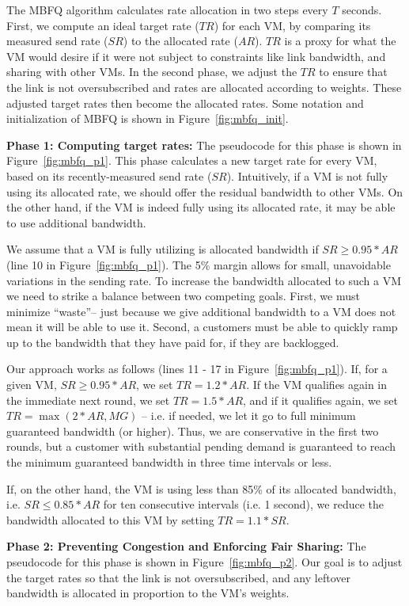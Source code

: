 The MBFQ algorithm calculates rate allocation in two steps every $T$ seconds.
First, we compute an ideal target rate ($TR$) for each VM, by comparing its
measured send rate ($SR$) to the allocated rate ($AR$). $TR$ is a proxy for what
the VM would desire if it were not subject to constraints like link bandwidth,
and sharing with other VMs.  In the second phase, we adjust the $TR$ to ensure
that the link is not oversubscribed and rates are allocated according to
weights. These adjusted target rates then become the allocated rates.  Some
notation and initialization of MBFQ is shown in Figure~\ref{fig:mbfq_init}. 

{\bf Phase 1: Computing target rates:} 
The pseudocode for this phase is shown in Figure~\ref{fig:mbfq_p1}.  This phase
calculates a new target rate for every VM, based on its recently-measured send
rate ($SR$). Intuitively, if a VM is not fully using its allocated rate, we
should offer the residual bandwidth to other VMs.  On the other hand, if the VM
is indeed fully using its allocated rate, it may be able to use additional
bandwidth. 

We assume that a VM is fully utilizing is allocated bandwidth if $SR \geq
0.95*AR$ (line 10 in Figure~\ref{fig:mbfq_p1}). The 5\% margin allows for small, unavoidable variations in the sending
rate. To increase the bandwidth allocated to such a VM we need to strike a
balance between two competing goals. First, we must minimize ``waste''-- just
because we give additional bandwidth to a VM does not mean it will be able to
use it. Second, a customers must be able to quickly ramp up to the bandwidth
that they have paid for, if they are backlogged.

Our approach works as follows (lines 11 - 17 in Figure~\ref{fig:mbfq_p1}).  
If, for a given VM, $SR \geq 0.95*AR$, we set
$TR = 1.2*AR$.  If the VM qualifies again in the immediate next round, we set
$TR = 1.5*AR$, and if it qualifies again, we set $TR = \max(2*AR, MG)$ -- i.e.
if needed, we let it go to full minimum guaranteed bandwidth (or higher).  Thus,
we are conservative in the first two rounds, but a customer with substantial
pending demand is guaranteed to reach the minimum guaranteed bandwidth in three
time intervals or less.

If, on the other hand, the VM is using less than 85\% of its allocated
bandwidth, i.e. $SR \leq 0.85*AR$ for ten consecutive intervals (i.e. 1 second),
we reduce the bandwidth allocated to this VM by setting $TR = 1.1*SR$. 

{\bf Phase 2:  Preventing Congestion and Enforcing Fair Sharing:} The pseudocode
for this phase is shown in Figure~\ref{fig:mbfq_p2}. Our goal is to adjust the
target rates so that the link is not oversubscribed, and any leftover bandwidth
is allocated in proportion to the VM's weights.

